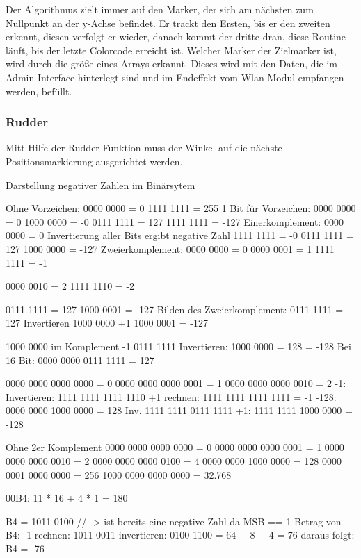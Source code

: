     Der Algorithmus zielt immer auf den Marker, der sich am nächsten zum Nullpunkt an der y-Achse befindet. Er trackt den Ersten, bis er den zweiten erkennt, diesen verfolgt er wieder, danach kommt der dritte dran, diese Routine läuft, bis der letzte Colorcode erreicht ist. Welcher Marker der Zielmarker ist, wird durch die größe eines Arrays erkannt. Dieses wird mit den Daten, die im Admin-Interface hinterlegt sind und im Endeffekt vom Wlan-Modul empfangen werden, befüllt.

    \subsubsection{Rudder}

    Mitt Hilfe der Rudder Funktion muss der Winkel auf die nächste Positionsmarkierung ausgerichtet werden.


    Darstellung negativer Zahlen im Binärsytem

Ohne Vorzeichen: 
0000 0000 = 0
1111 1111 = 255
1 Bit für Vorzeichen:
    0000 0000 = 0
    1000 0000 = -0
    0111 1111 = 127
    1111 1111 = -127
Einerkomplement:
    0000 0000 = 0
    Invertierung aller Bits ergibt negative Zahl
    1111 1111 = -0
    0111 1111 = 127
    1000 0000 = -127
Zweierkomplement:
    0000 0000 = 0
    0000 0001 = 1
    1111 1111 = -1

    0000 0010 = 2
    1111 1110 = -2

    0111 1111 = 127
    1000 0001 = -127
Bilden des Zweierkomplement:
    0111 1111 = 127
Invertieren
    1000 0000
+1
    1000 0001 = -127
    
    1000 0000 im Komplement
           -1
    0111 1111 Invertieren:
    1000 0000 = 128 = -128
Bei 16 Bit:
    0000 0000 0111 1111 = 127

0000 0000 0000 0000 = 0
0000 0000 0000 0001 = 1
0000 0000 0000 0010 = 2
-1:
Invertieren: 1111 1111 1111 1110
+1 rechnen:  1111 1111 1111 1111 = -1
-128:
0000 0000 1000 0000 = 128
Inv. 1111 1111 0111 1111
+1:  1111 1111 1000 0000 = -128

Ohne 2er Komplement {
0000 0000 0000 0000 = 0
0000 0000 0000 0001 = 1
0000 0000 0000 0010 = 2
0000 0000 0000 0100 = 4
0000 0000 1000 0000 = 128
0000 0001 0000 0000 = 256
1000 0000 0000 0000 = 32.768}


00B4: 11 * 16 + 4 * 1 = 180

B4 = 1011 0100 // -> ist bereits eine negative Zahl da MSB == 1
Betrag von B4:
    -1 rechnen:  1011 0011
    invertieren: 0100 1100 = 64 + 8 + 4 = 76
daraus folgt: B4 = -76


